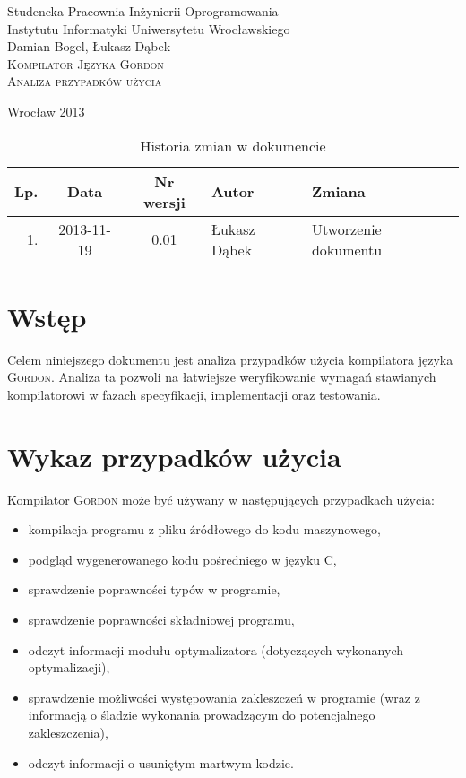 \documentclass{documentation}
\begin{document}
\begin{titlepage}
\begin{center}
Studencka Pracownia Inżynierii Oprogramowania\\
Instytutu Informatyki Uniwersytetu Wrocławskiego\\[6cm]

Damian Bogel, Łukasz Dąbek\\[1cm]
\textsc{\LARGE Kompilator Języka Gordon}\\[0.5cm]
\textsc{\large Analiza przypadków użycia}

\vfill
Wrocław 2013 \\[2.5cm]

\end{center}
\end{titlepage}

\newpage
\begin{table}
	\centering
    \captionsetup{name=Tabela}
	\caption{Historia zmian w dokumencie}
		\begin{tabular}{|r|c|c|l|l|}
		\hline
		Lp.  & Data       & Nr wersji & Autor                 & Zmiana \\ \hline
		1.   & 2013-11-19 & 0.01 & Łukasz Dąbek & Utworzenie dokumentu \\ \hline
	\end{tabular}
\end{table}
\newpage

\tableofcontents
\setcounter{page}{2}

\newpage

\section{Wstęp}
\noindent Celem niniejszego dokumentu jest analiza przypadków użycia kompilatora
języka \textsc{Gordon}. Analiza ta pozwoli na łatwiejsze weryfikowanie wymagań
stawianych kompilatorowi w fazach specyfikacji, implementacji oraz testowania.

\section{Wykaz przypadków użycia}
\noindent Kompilator \textsc{Gordon} może być używany w następujących przypadkach użycia:
\begin{itemize}
    \item kompilacja programu z pliku źródłowego do kodu maszynowego,
    \item podgląd wygenerowanego kodu pośredniego w języku \textsc{C},
    \item sprawdzenie poprawności typów w programie,
    \item sprawdzenie poprawności składniowej programu,
    \item odczyt informacji modułu optymalizatora (dotyczących wykonanych optymalizacji),
    \item sprawdzenie możliwości występowania zakleszczeń w programie (wraz z informacją
        o śladzie wykonania prowadzącym do potencjalnego zakleszczenia),
    \item odczyt informacji o usuniętym martwym kodzie.
\end{itemize}
\end{document}
